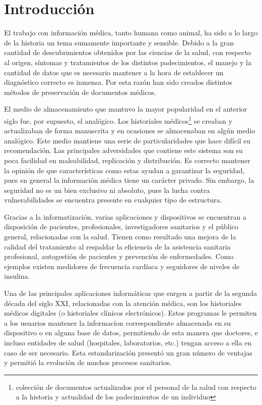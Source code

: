 
\chapter*{Introducción}\label{chapter:introduction}

El trabajo con informaci\'on m\'edica, tanto humana como animal, ha sido a lo largo de la historia un tema sumamente importante y sensible. Debido a la gran cantidad de descubrimientos obtenidos por las ciencias de la salud, con respecto al origen, s\'intomas y tratamientos de los distintos padecimientos, el manejo y la cantidad de datos que es necesario mantener a la hora de establecer un diagn\'ostico correcto es inmensa. Por esta raz\'on han sido creados distintos m\'etodos de preservaci\'on de documentos m\'edicos.

El medio de almacenamiento que mantuvo la mayor popularidad en el anterior siglo fue, por supuesto, el anal\'ogico. Los historiales m\'edicos\footnote{colecci\'on de documentos actualizados por el personal de la salud con respecto a la historia y actualidad de los padecimientos de un individuo} se creaban y actualizaban de forma manuscrita y en ocasiones se almacenaban en algún medio analógico. Este medio mantiene una serie de particularidades que hace dif\'icil su recomendaci\'on. Las principales adversidades que contiene este sistema son su poca facilidad en maleabilidad, replicaci\'on y distribuci\'on. Es correcto mantener la opini\'on de que caracter\'isticas como estas ayudan a garantizar la seguridad, pues en general la información médica tiene un car\'acter privado. Sin embargo, la seguridad no es un bien exclusivo ni absoluto, pues la lucha contra vulnerabilidades se encuentra presente en cualquier tipo de estructura.

Gracias a la informatizaci\'on, varias aplicaciones y dispositivos se encuentran a disposición de pacientes, profesionales, investigadores sanitarios y el p\'ublico general, relacionadas con la salud. Tienen como resultado una mejora de la calidad del tratamiento al respaldar la eficiencia de la asistencia sanitaria profesional, autogestión de pacientes y prevención de enfermedades. Como ejemplos existen medidores de frecuencia card\'iaca y seguidores de niveles de insulina.

Una de las principales aplicaciones informáticas que surgen a partir de la segunda d\'ecada del siglo XXI, relacionadas con la atenci\'on m\'edica, son los historiales m\'edicos digitales (o historiales clínicos electr\'onicos). Estos programas le permiten a los usuarios mantener la informac\'ion correspondiente almacenada en su dispositivo o en alguna base de datos, permitiendo de esta manera que doctores, e incluso entidades de salud (hospitales, laboratorios, etc.) tengan acceso a ella en caso de ser necesario. Esta estandarizaci\'on present\'o un gran n\'umero de ventajas y permiti\'o la evoluci\'on de muchos procesos sanitarios. 

